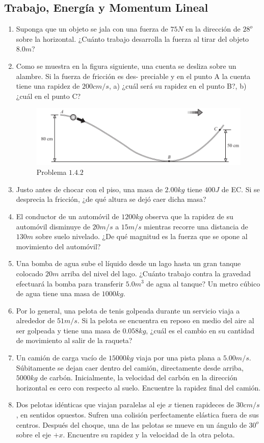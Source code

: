 \subsection{Trabajo, Energía y Momentum Lineal}
\begin{enumerate}
	\item Suponga que un objeto se jala con una fuerza de $75 N$ en la dirección de $28^o$ sobre la
horizontal. ¿Cuánto trabajo desarrolla la fuerza al tirar del objeto $8.0 m$?
	\item Como se muestra en la figura siguiente, una cuenta se desliza sobre un alambre. Si la fuerza de fricción es des-
preciable y en el punto A la cuenta tiene una rapidez de $200 cm/s$, a) ¿cuál será su rapidez en el punto B?,
b) ¿cuál en el punto C?
		\begin{figure}[H]
			\centering
			\includegraphics[scale=0.6]{Images/alambre.png}
			\caption{Problema $1.4.2$}
			\label{tresbloques}
		\end{figure}
	\item Justo antes de chocar con el piso, una masa de $2.00 kg$ tiene $400 J$ de EC. Si se desprecia la fricción, ¿de qué
altura se dejó caer dicha masa?
	\item El conductor de un automóvil de $1 200 kg$ observa que la rapidez de su automóvil disminuye de $20 m/s$ a
$15 m/s$ mientras recorre una distancia de $130 m$ sobre suelo nivelado. ¿De qué magnitud es la fuerza que se
opone al movimiento del automóvil?
	\item Una bomba de agua sube el líquido desde un lago hasta un gran tanque colocado $20 m$ arriba del nivel del lago.
¿Cuánto trabajo contra la gravedad efectuará la bomba para transferir $5.0 m^3$ de agua al tanque? Un metro
cúbico de agua tiene una masa de $1 000 kg$.
	\item Por lo general, una pelota de tenis golpeada durante un servicio viaja a alrededor de $51 m/s$. Si la pelota se
encuentra en reposo en medio del aire al ser golpeada y tiene una masa de $0.058 kg$, ¿cuál es el cambio en su
cantidad de movimiento al salir de la raqueta?
	\item Un camión de carga vacío de $15 000 kg$ viaja por una pista plana a $5.00 m/s$. Súbitamente se dejan caer dentro
del camión, directamente desde arriba, $5 000 kg$ de carbón. Inicialmente, la velocidad del carbón en la dirección horizontal es cero con respecto al suelo. Encuentre la rapidez ﬁnal del camión.	
	\item Dos pelotas idénticas que viajan paralelas al eje $x$ tienen rapideces de $30 cm/s$, en sentidos opuestos. Sufren
una colisión perfectamente elástica fuera de sus centros. Después del choque, una de las pelotas se mueve en
un ángulo de $30^o$ sobre el eje $+x$. Encuentre su rapidez y la velocidad de la otra pelota.
\end{enumerate}

